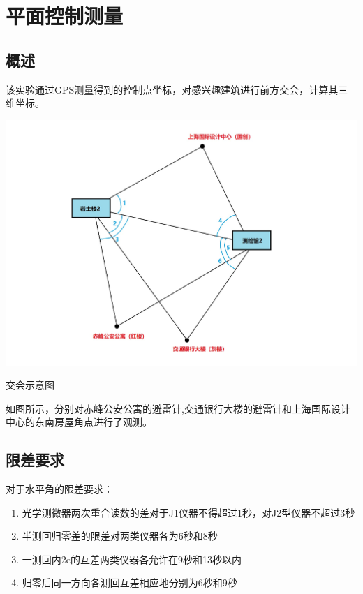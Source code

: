 \documentclass[a4paper,16pt,UTF8]{article}
\begin{document}
\newpage
\section{\LARGE 平面控制测量}

\subsection{概述}
该实验通过GPS测量得到的控制点坐标，对感兴趣建筑进行前方交会，计算其三维坐标。

\begin{center}
    \includegraphics[scale =0.4]{jiaohui.jpg}
    
    交会示意图
\end{center}
如图所示，分别对赤峰公安公寓的避雷针,交通银行大楼的避雷针和上海国际设计中心的东南房屋角点进行了观测。

\subsection{限差要求}

对于水平角的限差要求：
\begin{center}
    \begin{enumerate}
        \item  光学测微器两次重合读数的差对于J1仪器不得超过1秒，对J2型仪器不超过3秒
        \item 半测回归零差的限差对两类仪器各为6秒和8秒
        \item 一测回内2c的互差两类仪器各允许在9秒和13秒以内
        \item 归零后同一方向各测回互差相应地分别为6秒和9秒
    \end{enumerate}
\end{center}
\end{document}
